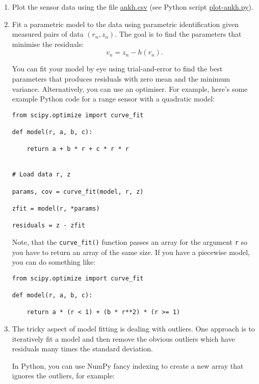 \documentclass[a4paper, 12pt]{article}
\newcommand{\code}[1]{\texttt{#1}}
\begin{document}
\begin{enumerate}
\item Plot the sensor data using the file \url{ankh.csv} (see
  Python script \url{plot-ankh.py}).

\item Fit a parametric model to the data using
  parametric identification given measured pairs of data $(r_n, z_n)$.
  The goal is to find the parameters that minimise the residuals:
    \begin{equation}
    v_n = z_n - h(r_n).
    \end{equation}

    You can fit your model by eye using trial-and-error to find the
    best parameters that produces residuals with zero mean and the
    minimum variance.  Alternatively, you can use an optimiser.  For
    example, here's some example Python code for a range sensor with a
    quadratic model:
%
\begin{verbatim}
from scipy.optimize import curve_fit

def model(r, a, b, c):

    return a + b * r + c * r * r


# Load data r, z

params, cov = curve_fit(model, r, z)

zfit = model(r, *params)

residuals = z - zfit
\end{verbatim}

  Note, that the \code{curve\_fit()} function passes an array for the
  argument \code{r} so you have to return an array of the same size.
  If you have a piecewise model, you can do something like:

\begin{verbatim}
from scipy.optimize import curve_fit

def model(r, a, b, c):

    return a * (r < 1) + (b * r**2) * (r >= 1)

\end{verbatim}

\item The tricky aspect of model fitting is dealing with outliers.
  One approach is to iteratively fit a model and then remove the
  obvious outliers which have residuals many times the standard
  deviation.

  In Python, you can use NumPy fancy indexing to create a new array that
  ignores the outliers, for example:


\end{enumerate}
\end{document}

